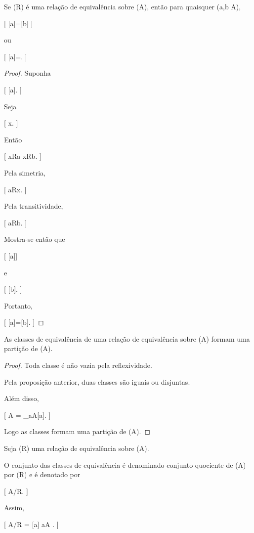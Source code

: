 \documentclass[../../main]{subfiles}
\begin{document}
\begin{prop}
	\label{prop:matematica:relacoes:classes-iguais-ou-disjuntas}

	Se (R) é uma relação de equivalência sobre (A), então para
	quaisquer (a,b \in A),

	[
			[a]=[b]
		]

	ou

		[
			[a]\cap[b]=\varnothing.
		]

\end{prop}

\begin{proof}

	Suponha

	[
	[a]\cap[b]\neq\varnothing.
	]

	Seja

		[
			x\in[a]\cap[b].
		]

	Então

	[
	xRa
	\quad{}\quad
	xRb.
	]

	Pela simetria,

	[
			aRx.
		]

	Pela transitividade,

	[
			aRb.
		]

	Mostra-se então que

		[
			[a]\subseteq[b]
		]

	e

		[
			[b]\subseteq[a].
		]

	Portanto,

	[
			[a]=[b].
		]

\end{proof}

\begin{prop}
	\label{prop:matematica:relacoes:particao}

	As classes de equivalência de uma relação de equivalência sobre (A)
	formam uma partição de (A).

\end{prop}

\begin{proof}

	Toda classe é não vazia pela reflexividade.

	Pela proposição anterior, duas classes são iguais ou disjuntas.

	Além disso,

	[
			A
			=
			\bigcup_{a\in A}[a].
		]

	Logo as classes formam uma partição de (A).

\end{proof}

\begin{defn}
	\label{def:matematica:relacoes:conjunto-quociente}

	Seja (R) uma relação de equivalência sobre (A).

	O conjunto das classes de equivalência é denominado conjunto
	quociente de (A) por (R) e é denotado por

		[
			A/R.
		]

	Assim,

	[
			A/R
				=
				{
					[a]
					\mid
					a\in A
				}.
		]

\end{defn}
\end{document}
